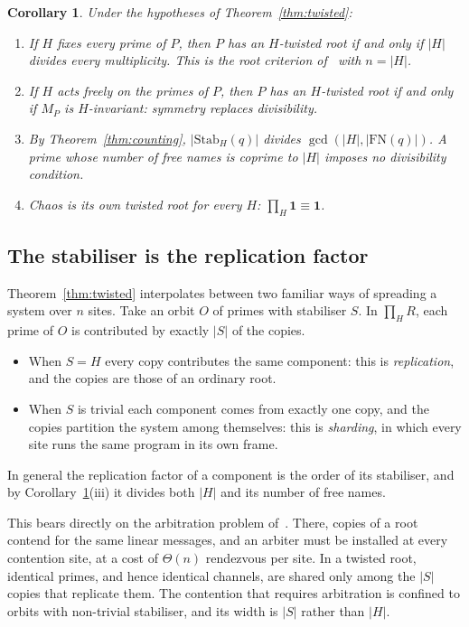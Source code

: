 \documentclass[11pt]{article}
\newtheorem{corollary}[theorem]{Corollary}
\theoremstyle{definition}
\theoremstyle{remark}
\newcommand{\chaos}{\mathbf{1}}
\newcommand{\scong}{\equiv}
\newcommand{\FN}{\mathrm{FN}}
\newcommand{\Stab}{\mathrm{Stab}}
\begin{document}
\begin{corollary}\label{cor:roots}
Under the hypotheses of Theorem~\ref{thm:twisted}:
\begin{enumerate}[label=(\roman*)]
\item If $H$ fixes every prime of $P$, then $P$ has an $H$-twisted root if and
  only if $|H|$ divides every multiplicity. This is the root criterion
  of~\cite{rft} with $n=|H|$.
\item If $H$ acts freely on the primes of $P$, then $P$ has an $H$-twisted root
  if and only if $M_P$ is $H$-invariant: symmetry replaces divisibility.
\item By Theorem~\ref{thm:counting}, $|\Stab_H(q)|$ divides
  $\gcd(|H|,|\FN(q)|)$. A prime whose number of free names is coprime to $|H|$
  imposes no divisibility condition.
\item Chaos is its own twisted root for every $H$: $\prod_H\chaos\scong\chaos$.
\end{enumerate}
\end{corollary}

\subsection{The stabiliser is the replication factor}

Theorem~\ref{thm:twisted} interpolates between two familiar ways of spreading
a system over $n$ sites. Take an orbit $O$ of primes with stabiliser $S$. In
$\prod_H R$, each prime of $O$ is contributed by exactly $|S|$ of the copies.
\begin{itemize}[leftmargin=1.5em]
\item When $S=H$ every copy contributes the same component: this is
  \emph{replication}, and the copies are those of an ordinary root.
\item When $S$ is trivial each component comes from exactly one copy, and the
  copies partition the system among themselves: this is \emph{sharding}, in
  which every site runs the same program in its own frame.
\end{itemize}
In general the replication factor of a component is the order of its
stabiliser, and by Corollary~\ref{cor:roots}(iii) it divides both $|H|$ and its
number of free names.

This bears directly on the arbitration problem of~\cite{rft}. There, copies of
a root contend for the same linear messages, and an arbiter must be installed
at every contention site, at a cost of $\Theta(n)$ rendezvous per site. In a
twisted root, identical primes, and hence identical channels, are shared only
among the $|S|$ copies that replicate them. The contention that requires
arbitration is confined to orbits with non-trivial stabiliser, and its width
is $|S|$ rather than $|H|$.
\end{document}
